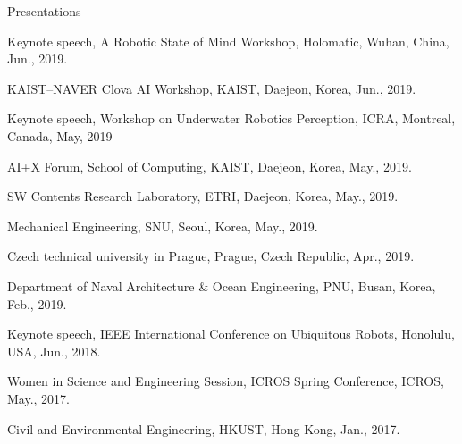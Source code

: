 \begin{rSection}{Presentations}

\begin{pubSubsectionNum}{}
  \item Keynote speech, A Robotic State of Mind Workshop, Holomatic, Wuhan, China, Jun., 2019.

  \item KAIST--NAVER Clova AI Workshop, \ac{KAIST}, Daejeon, Korea, Jun., 2019.

  \item Keynote speech, Workshop on Underwater Robotics Perception, ICRA, Montreal, Canada, May, 2019

  \item AI+X Forum, School of Computing, \ac{KAIST}, Daejeon, Korea, May., 2019.

  \item SW Contents Research Laboratory, \ac{ETRI}, Daejeon, Korea, May., 2019.

  \item Mechanical Engineering, \ac{SNU}, Seoul, Korea, May., 2019.

  \item Czech technical university in Prague, Prague, Czech Republic, Apr., 2019.

  \item Department of Naval Architecture \& Ocean Engineering, \ac{PNU}, Busan, Korea, Feb., 2019.





  \item Keynote speech, IEEE International Conference on Ubiquitous Robots, Honolulu, USA, Jun., 2018.

  \item Women in Science and Engineering Session, ICROS Spring Conference, \acf{ICROS}, May., 2017.

  \item Civil and Environmental Engineering, \ac{HKUST}, Hong Kong, Jan., 2017.


\end{pubSubsectionNum}
\end{rSection}
